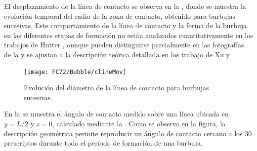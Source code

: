 El desplazamiento de la l\'inea de contacto se observa en la , donde se muestra la evoluci\'on temporal del radio de la zona de contacto, obtenido para burbujas sucesivas. Este comportamiento de la l\'inea de contacto y la forma de la burbuja en las diferentes etapas de formaci\'on no est\'an analizados cuantitativamente en los trabajos de Hutter \cite{hutter_experimental_2009, hutter_experimental_2010}, aunque pueden distinguirse parcialmente en las fotograf\'ias de la  y se ajustan a la descripci\'on te\'orica detallada en los trabajo de Xu \cite{xu_single-bubble_2014} y .

\begin{figure}[ht]
	\centering
	\texttt{[image: FC72/Bubble/clineMov]}
	\caption{Evoluci\'on del di\'ametro de la l\'inea de contacto para burbujas sucesivas.}
	\label{fig:linea_contacto}
\end{figure}

En la  se muestra el \'angulo de contacto medido sobre una l\'inea ubicada en $y=L/2$ y $z=0$, calculado mediante la . Como se observa en la figura, la descripci\'on geom\'etrica permite reproducir un \'angulo de contacto cercano a los $30$\textordmasculine prescriptos durante todo el per\'iodo de formaci\'on de una burbuja.

